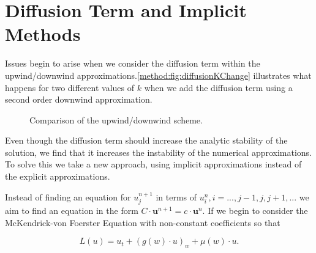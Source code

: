\documentclass[../main.tex]{subfiles}
\begin{document}
  \section{Diffusion Term and Implicit Methods}
  Issues begin to arise when we consider the diffusion term within the upwind/downwind approximations.\autoref{method:fig:diffusionKChange} illustrates what happens for two different values of $k$ when we add the diffusion term using a second order downwind approximation.

  \begin{figure}[htb]
    \centering
    \caption{\label{method:fig:diffusionKChange} Comparison of the upwind/downwind scheme.}
  \end{figure}

  Even though the diffusion term should increase the analytic stability of the solution, we find that it increases the instability of the numerical approximations. To solve this we take a new approach, using implicit approximations instead of the explicit approximations.

  Instead of finding an equation for $u^{n+1}_j$ in terms of $u^n_i, i = ..., j-1, j, j+1, ... $ we aim to find an equation in the form $C \cdot \textbf{u}^{n+1} = c \cdot \textbf{u}^n$. If we begin to consider the McKendrick-von Foerster Equation with non-constant coefficients so that

  \begin{equation}
    L(u) = u_t + (g(w) \cdot u)_w + \mu(w) \cdot u.
  \end{equation}
\end{document}
